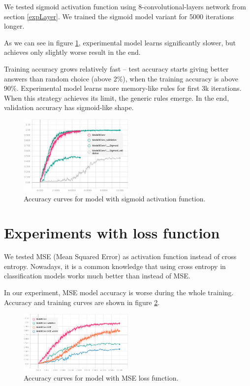 \documentclass[a4paper]{article}
\begin{document}
We tested sigmoid activation function using 8-convolutional-layers network from section \ref{expLayer}.
We trained the sigmoid model variant for 5000 iterations longer.

As we can see in figure \ref{fig:sigmoid}, experimental model learns significantly slower,
but achieves only slightly worse result in the end.

Training accuracy grows relatively fast -- test accuracy
starts giving better answers than random choice (above 2\%),
when the training accuracy is above 90\%.
Experimental model learns more memory-like rules for first 3k iterations.
When this strategy achieves its limit, the generic rules emerge.
In the end, validation accuracy has sigmoid-like shape.



\begin{figure}[!h]
    \centering
    \includegraphics[page=2,width=0.5\textwidth]{sigmoidConv.png}
    \caption[]{Accuracy curves for model with sigmoid activation function.
    \label{fig:sigmoid}
    }
\end{figure}


\section{Experiments with loss function}

We tested MSE (Mean Squared Error) as activation function instead of cross entropy.
Nowadays, it is a common knowledge that using cross entropy in classification models works much better than instead of
MSE.

In our experiment, MSE model accuracy is worse during the whole training. Accuracy and training curves are shown in figure \ref{fig:mse}.

\begin{figure}[!h]
    \centering
    \includegraphics[page=2,width=0.5\textwidth]{sqrLoss.png}
    \caption[]{Accuracy curves for model with MSE loss function.
    \label{fig:mse}
    }
\end{figure}
\end{document}
